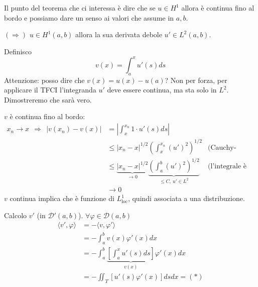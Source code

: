 \documentclass[10pt,a4paper,twoside,openright]{book}
\begin{document}
Il punto del teorema che ci interessa è dire che se $u\in H^{1}$ allora è continua fino al bordo e possiamo dare un senso ai valori che assume in $a,b$.
\begin{dimostrazione}
	$( \Rightarrow )$ $u\in H^{1}( a,b)$ allora la sua derivata debole $u'\in L^{2}( a,b)$.
	
	Definisco
	\begin{equation*}
		v( x) =\int ^{x}_{a} u'( s) ds
	\end{equation*}
	Attenzione: posso dire che $v( x) =u( x) -u( a)$? Non per forza, per applicare il TFCI l'integranda $u'$ deve essere continua, ma sta solo in $L^{2}$. Dimostreremo che sarà vero.
	
	$v$ è continua fino al bordo:
	\begin{align*}
		x_{n}\rightarrow x\ \ \Rightarrow \ \ | v( x_{n}) -v( x)| & =\left| \int ^{x_{n}}_{x} 1\cdot u'( s) ds\right|                                                                                                 &                                  \\
		                                                          & \leqslant | x_{n} -x| ^{1/2}\left(\int ^{x_{n}}_{x}( u')^{2}\right)^{1/2}                                                                  & \text{(Cauchy-Schwarz)} \\
		                                                          & \leqslant \underbrace{| x_{n} -x| ^{1/2}}_{\rightarrow 0}\underbrace{\left(\int ^{b}_{a}( u')^{2}\right)^{1/2}}_{\leqslant C,\ u'\in L^{2}} & \text{(l'integrale è positivo)} \\
		                                                          & \rightarrow 0                                                                                                                              &                                  
	\end{align*}
	$v$ continua implica che è funzione di $L^{1}_{\mathrm{loc}}$, quindi associata a una distribuzione.
	
	Calcolo $v'$ (in $\mathcal{D} '( a,b)$). $\forall \varphi \in \mathcal{D}( a,b)$
	\begin{align*}
		\langle v',\varphi \rangle & =-\langle v,\varphi '\rangle \\
								   & =-\int ^{b}_{a} v( x) \varphi '( x) dx\\
								   & =-\int ^{b}_{a}\underbrace{\left[\int ^{x}_{a} u'( s) ds\right]}_{v(x)} \varphi '( x) dx \\
		                           & =-\iint _{T}[ u'( s) \varphi '( x)] dsdx=( *)                                                                                           
	\end{align*}



\end{dimostrazione}
\end{document}
